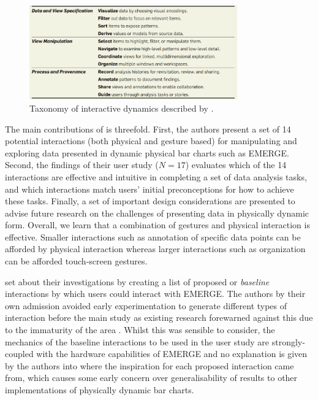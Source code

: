 \documentclass[11pt]{article}
\begin{document}
\begin{figure}[H]
\centering
\includegraphics[width=0.8\textwidth]{img/heer2012-taxonomy.png} 
\caption{Taxonomy of interactive dynamics described by \protect\citet{heer2012}.}\label{fig:heer2012-taxonomy}
\end{figure}

The main contributions of \citet{taher2015} is threefold. First, the authors present a set of 14 potential interactions (both physical and gesture based) for manipulating and exploring data presented in dynamic physical bar charts such as EMERGE. Second, the findings of their user study ($N=17$) evaluates which of the 14 interactions are effective and intuitive in completing a set of data analysis tasks, and which interactions match users' initial preconceptions for how to achieve these tasks. Finally, a set of important design considerations are presented to advise future research on the challenges of presenting data in physically dynamic form. Overall, we learn that a combination of gestures and physical interaction is effective. Smaller interactions such as annotation of specific data points can be afforded by physical interaction whereas larger interactions such as organization can be afforded touch-screen gestures. 

\citeauthor{taher2015} set about their investigations by creating a list of proposed or \textit{baseline} interactions by which users could interact with EMERGE. The authors by their own admission avoided early experimentation to generate different types of interaction before the main study as existing research forewarned against this due to the immaturity of the area \citep{hornbaek2013}. Whilst this was sensible to consider, the mechanics of the baseline interactions to be used in the user study are strongly-coupled with the hardware capabilities of EMERGE and no explanation is given by the authors into where the inspiration for each proposed interaction came from, which causes some early concern over generalisability of results to other implementations of physically dynamic bar charts.
\end{document}
